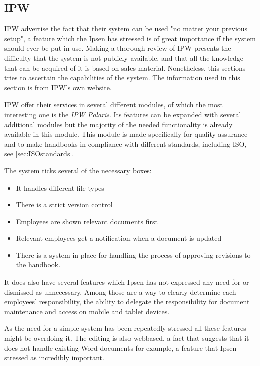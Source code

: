 \subsection{IPW}
IPW advertise the fact that their system can be used "no matter your previous setup", a feature which the Ipsen has stressed is of great importance if the system should ever be put in use.
Making a thorough review of IPW presents the difficulty that the system is not publicly available, and that all the knowledge that can be acquired of it is based on sales material.
Nonetheless, this sections tries to ascertain the capabilities of the system.
The information used in this section is from IPW's own website\cite{IPW}.

IPW offer their services in several different modules, of which the most interesting one is the \textit{IPW Polaris}.
Its features can be expanded with several additional modules but the majority of the needed functionality is already available in this module.
This module is made specifically for quality assurance and to make handbooks in compliance with different standards, including ISO, see \cref{sec:ISOstandards}.

The system ticks several of the necessary boxes:

\begin{itemize}
    \item
        It handles different file types
    \item
        There is a strict version control
    \item
        Employees are shown relevant documents first
    \item
        Relevant employees get a notification when a document is updated
    \item
        There is a system in place for handling the process of approving revisions to the handbook.
\end{itemize}

It does also have several features which Ipsen has not expressed any need for or dismissed as unnecessary.
Among those are a way to clearly determine each employees' responsibility, the ability to delegate the responsibility for document maintenance and access on mobile and tablet devices.

As the need for a simple system has been repeatedly stressed all these features might be overdoing it.
The editing is also webbased, a fact that suggests that it does not handle existing Word documents for example, a feature that Ipsen stressed as incredibly important.
